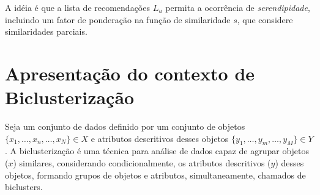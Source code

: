 \documentclass[normaltoc, espacoumemeio, pnumromarab,ruledheader]{abnt}
\begin{document}

A idéia é que a lista de recomendações $L_u$ permita a ocorrência de \textit{serendipidade}, incluindo um fator de ponderação na função de similaridade $s$, que considere similaridades parciais.





\section{Apresentação do contexto de Biclusterização}


Seja um conjunto de dados definido por um conjunto de objetos $\{ x_1, \dots, x_n, \dots, x_N \} \in X$ e atributos descritivos desses objetos $\{ y_1, \dots, y_m, \dots, y_M \} \in Y$. A biclusterização é uma técnica para análise de dados capaz de agrupar objetos ($x$) similares, considerando condicionalmente, os atributos descritivos ($y$) desses objetos, formando grupos de objetos e atributos, simultaneamente, chamados de biclusters.

\end{document}
